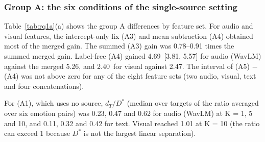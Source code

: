 \subsubsection{Group A: the six conditions of the single-source setting}\label{sec:rq1a-single}
Table~\ref{tab:rq1a}(a) shows the group A differences by feature set. For audio and visual features, the intercept-only fix (A3) and mean subtraction (A4) obtained most of the merged gain. The summed (A3) gain was 0.78--0.91 times the summed merged gain. Label-free (A4) gained 4.69\pt\ [3.81, 5.57] for audio (WavLM) against the merged 5.26\pt, and 2.40\pt\ for visual against 2.47\pt. The interval of (A5) $-$ (A4) was not above zero for any of the eight feature sets (two audio, visual, text and four concatenations).

For (A1), which uses no source, $d_T/D^{*}$ (median over targets of the ratio averaged over six emotion pairs) was 0.23, 0.47 and 0.62 for audio (WavLM) at K = 1, 5 and 10, and 0.11, 0.32 and 0.42 for text. Visual reached 1.01 at K = 10 (the ratio can exceed 1 because $D^{*}$ is not the largest linear separation).

